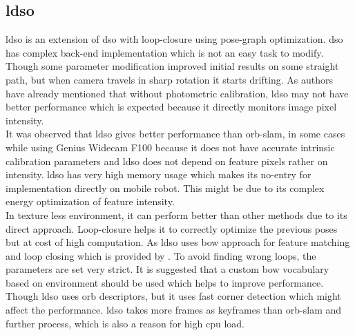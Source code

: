 \subsection{\acrshort{ldso}}
\acrshort{ldso} is an extension of \acrshort{dso} with loop-closure using pose-graph optimization. \acrshort{dso} has complex back-end implementation which is not an easy task to modify. Though some parameter modification improved initial results on some straight path, but when camera travels in sharp rotation it starts drifting. As authors have already mentioned \cite{yang2018challenges} that without photometric calibration, \acrshort{ldso} may not have better performance which is expected because it directly monitors image pixel intensity.\\
\newline It was observed that \acrshort{ldso} gives better performance than \acrshort{orb}-\acrshort{slam}, in some cases while using Genius Widecam F100 because it does not have accurate intrinsic calibration parameters and \acrshort{ldso} does not depend on feature pixels rather on intensity. \acrshort{ldso} has very high memory usage which makes its no-entry for implementation directly on mobile robot. This might be due to its complex energy optimization of feature intensity.\\
\newline In texture less environment, it can perform better than other methods due to its direct approach. Loop-closure helps it to correctly optimize the previous poses but at cost of high computation. As \acrshort{ldso} uses \acrlong{bow} approach for feature matching and loop closing which is provided by \cite{DboW}. To avoid finding wrong loops, the parameters are set very strict. It is suggested that a custom \acrlong{bow} vocabulary based on environment should be used which helps to improve performance. Though \acrshort{ldso} uses \acrshort{orb} descriptors, but it uses \acrshort{fast} corner detection which might affect the performance. \acrshort{ldso} takes more frames as keyframes than \acrshort{orb}-\acrshort{slam} and further process, which is also a reason for high \acrshort{cpu} load.

